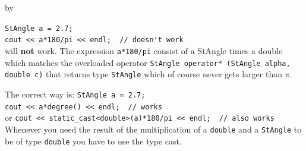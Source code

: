 \documentclass[twoside]{article}
\newcommand{\entrylabel}[1]{\mbox{\textbf{{#1}}}\hfil}%
\newenvironment{entry}
{\begin{list}{}%
    {\renewcommand{\makelabel}{\entrylabel}%
     \setlength{\labelwidth}{90pt}%
     \setlength{\leftmargin}{\labelwidth}
     \advance\leftmargin by \labelsep%
      }%
    }%
  {\end{list}}
\newcommand{\Entrylabel}[1]%
{\raisebox{0pt}[1ex][0pt]{\makebox[\labelwidth][l]%
    {\parbox[t]{\labelwidth}{\hspace{0pt}\textbf{{#1}}}}}}
\newenvironment{Entry}%
{\renewcommand{\entrylabel}{\Entrylabel}\begin{entry}}%
  {\end{entry}}
\begin{document}
\begin{Entry}
    \verb+StAngle a = 2.7;+\\
    \verb+cout << a*180/pi << endl;  // doesn't work+\\
    
    will \textbf{not} work. The expression \texttt{a*180/pi} consist
    of a StAngle times a double which matches the overloaded operator
    \texttt{StAngle operator* (StAngle alpha, double c)} that returns
    type \texttt{StAngle} which of course never gets larger than
    $\pi$.
    
    The correct way is:
    \verb+StAngle a = 2.7;+\\
    \verb+cout << a*degree() << endl;  // works +\\
    or
    \verb+cout << static_cast<double>(a)*180/pi << endl;  // also works +\\
    
    Whenever you need the result of the multiplication of a
    \texttt{double} and a \texttt{StAngle} to be of type
    \texttt{double} you have to use the type cast.
    

\end{Entry}

\clearpage


%
%
\end{document}

